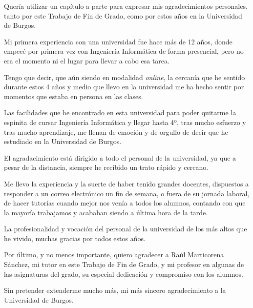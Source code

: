 
Quería utilizar un capítulo a parte para expresar mis agradecimientos personales, tanto por este Trabajo de Fin de Grado, como por estos años en la Universidad de Burgos.

Mi primera experiencia con una universidad fue hace más de 12 años, donde empecé por primera vez con Ingeniería Informática de forma presencial, pero no era el momento ni el lugar para llevar a cabo esa tarea.

Tengo que decir, que aún siendo en modalidad \textit{online}, la cercanía que he sentido durante estos 4 años y medio que llevo en la universidad me ha hecho sentir por momentos que estaba en persona en las clases.

Las facilidades que he encontrado en esta universidad para poder quitarme la espinita de cursar Ingeniería Informática y llegar hasta 4º, tras mucho esfuerzo y tras mucho aprendizaje, me llenan de emoción y de orgullo de decir que he estudiado en la Universidad de Burgos.

El agradacimiento está dirigido a todo el personal de la universidad, ya que a pesar de la distancia, siempre he recibido un trato rápido y cercano.

Me llevo la experiencia y la suerte de haber tenido grandes docentes, dispuestos a responder a un correo electrónico un fin de semana, o fuera de su jornada laboral, de hacer tutorías cuando mejor nos venía a todos los alumnos, contando con que la mayoría trabajamos y acababan siendo a última hora de la tarde.

La profesionalidad y vocación del personal de la universidad de los más altos que he vivido, muchas gracias por todos estos años.

Por último, y no menos importante, quiero agradecer a Raúl Marticorena Sánchez, mi tutor en este Trabajo de Fin de Grado, y mi profesor en algunas de las asignaturas del grado, su especial dedicación y compromiso con los alumnos.

Sin pretender extenderme mucho más, mi más sincero agradecimiento a la Universidad de Burgos.


